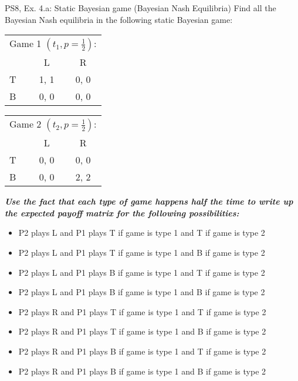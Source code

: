 \begin{frame}{PS8, Ex. 4.a: Static Bayesian game (Bayesian Nash Equilibria)}
    Find all the Bayesian Nash equilibria in the following static Bayesian game:
    \begin{table}
      \begin{tabular}{l|c|c|}
        \multicolumn{3}{c}{Game 1 $\left(t_1, p=\frac{1}{2}\right)$:}
        \\
        \multicolumn{1}{c}{} & \multicolumn{1}{c}{L} & \multicolumn{1}{c}{R} \\\cline{2-3}
        T & 1, 1 & 0, 0 \\\cline{2-3}
        B & 0, 0 & 0, 0 \\\cline{2-3}
      \end{tabular}
      \begin{tabular}{l|c|c|}
        \multicolumn{3}{c}{Game 2 $\left(t_2, p=\frac{1}{2}\right)$:}
        \\
        \multicolumn{1}{c}{} & \multicolumn{1}{c}{L} & \multicolumn{1}{c}{R} \\\cline{2-3}
        T & 0, 0 & 0, 0 \\\cline{2-3}
        B & 0, 0 & 2, 2 \\\cline{2-3}
      \end{tabular}
    \end{table}
    \textit{\textbf{Use the fact that each type of game happens half the time to write up the expected payoff matrix for the following possibilities:}}
    \begin{itemize}
        \item P2 plays L and P1 plays T if game is type 1 and T if game is type 2
        \item P2 plays L and P1 plays T if game is type 1 and B if game is type 2
        \item P2 plays L and P1 plays B if game is type 1 and T if game is type 2
        \item P2 plays L and P1 plays B if game is type 1 and B if game is type 2
        \item P2 plays R and P1 plays T if game is type 1 and T if game is type 2
        \item P2 plays R and P1 plays T if game is type 1 and B if game is type 2
        \item P2 plays R and P1 plays B if game is type 1 and T if game is type 2
        \item P2 plays R and P1 plays B if game is type 1 and B if game is type 2
    \end{itemize}
    \vfill\null\null
\end{frame}
